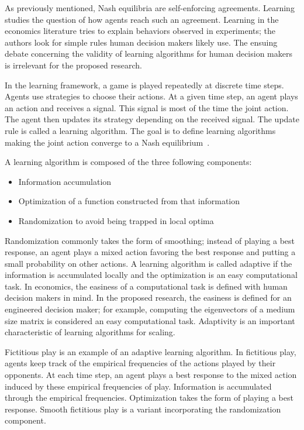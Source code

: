 As previously mentioned, Nash equilibria are self-enforcing agreements.
Learning studies the question of how agents reach such an agreement.
Learning in the economics literature tries to explain behaviors observed in experiments; the authors look for simple rules human decision makers likely use.
The ensuing debate concerning the validity of learning algorithms for human decision makers is irrelevant for the proposed research.

In the learning framework, a game is played repeatedly at discrete time steps.
Agents use strategies to choose their actions.
At a given time step, an agent plays an action and receives a signal.
This signal is most of the time the joint action.
The agent then updates its strategy depending on the received signal.
The update rule is called a learning algorithm.
The goal is to define learning algorithms making the joint action converge to a Nash equilibrium~\cite{fudenberg_levine:1998}.

A learning algorithm is composed of the three following components:
\begin{itemize}
\item Information accumulation
\item Optimization of a function constructed from that information
\item Randomization to avoid being trapped in local optima
\end{itemize}
Randomization commonly takes the form of smoothing; instead of playing a best response, an agent plays a mixed action favoring the best response and putting a small probability on other actions.
A learning algorithm is called adaptive if the information is accumulated locally and the optimization is an easy computational task.
In economics, the easiness of a computational task is defined with human decision makers in mind.
In the proposed research, the easiness is defined for an engineered decision maker; for example, computing the eigenvectors of a medium size matrix is considered an easy computational task.
Adaptivity is an important characteristic of learning algorithms for scaling.

Fictitious play is an example of an adaptive learning algorithm.
In fictitious play, agents keep track of the empirical frequencies of the actions played by their opponents.
At each time step, an agent plays a best response to the mixed action induced by these empirical frequencies of play.
Information is accumulated through the empirical frequencies.
Optimization takes the form of playing a best response.
Smooth fictitious play is a variant incorporating the randomization component.

